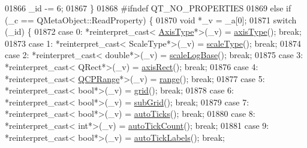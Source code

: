 \begin{DoxyCode}
01866         \_id -= 6;
01867     \}
01868 \textcolor{preprocessor}{#ifndef QT\_NO\_PROPERTIES}
01869       \textcolor{keywordflow}{else} \textcolor{keywordflow}{if} (\_c == QMetaObject::ReadProperty) \{
01870         \textcolor{keywordtype}{void} *\_v = \_a[0];
01871         \textcolor{keywordflow}{switch} (\_id) \{
01872         \textcolor{keywordflow}{case} 0: *\textcolor{keyword}{reinterpret\_cast<} \hyperlink{a00025_ae2bcc1728b382f10f064612b368bc18a}{AxisType}*\textcolor{keyword}{>}(\_v) = \hyperlink{a00025_a593c37bf6aa4990326dc09e24f45db7f}{axisType}(); \textcolor{keywordflow}{break};
01873         \textcolor{keywordflow}{case} 1: *\textcolor{keyword}{reinterpret\_cast<} ScaleType*\textcolor{keyword}{>}(\_v) = \hyperlink{a00025_a8563e13407bc0616da7f7c84e02de170}{scaleType}(); \textcolor{keywordflow}{break};
01874         \textcolor{keywordflow}{case} 2: *\textcolor{keyword}{reinterpret\_cast<} \textcolor{keywordtype}{double}*\textcolor{keyword}{>}(\_v) = \hyperlink{a00025_ac937d2a602f865aff2ab6c1e288739f6}{scaleLogBase}(); \textcolor{keywordflow}{break};
01875         \textcolor{keywordflow}{case} 3: *\textcolor{keyword}{reinterpret\_cast<} QRect*\textcolor{keyword}{>}(\_v) = \hyperlink{a00025_a7fe5b84f4891838b63ed5181f5811dc5}{axisRect}(); \textcolor{keywordflow}{break};
01876         \textcolor{keywordflow}{case} 4: *\textcolor{keyword}{reinterpret\_cast<} \hyperlink{a00049}{QCPRange}*\textcolor{keyword}{>}(\_v) = \hyperlink{a00025_ab1ea79a4f5ea4cf42620f8f51c477ac4}{range}(); \textcolor{keywordflow}{break};
01877         \textcolor{keywordflow}{case} 5: *\textcolor{keyword}{reinterpret\_cast<} \textcolor{keywordtype}{bool}*\textcolor{keyword}{>}(\_v) = \hyperlink{a00025_a5901fbdcd0e9f7e9cb2690b0bcef47ee}{grid}(); \textcolor{keywordflow}{break};
01878         \textcolor{keywordflow}{case} 6: *\textcolor{keyword}{reinterpret\_cast<} \textcolor{keywordtype}{bool}*\textcolor{keyword}{>}(\_v) = \hyperlink{a00025_a730554bcca1050436ee9e3c5cebfb447}{subGrid}(); \textcolor{keywordflow}{break};
01879         \textcolor{keywordflow}{case} 7: *\textcolor{keyword}{reinterpret\_cast<} \textcolor{keywordtype}{bool}*\textcolor{keyword}{>}(\_v) = \hyperlink{a00025_afc7f20e30dc2865ff6c39f3281f330c2}{autoTicks}(); \textcolor{keywordflow}{break};
01880         \textcolor{keywordflow}{case} 8: *\textcolor{keyword}{reinterpret\_cast<} \textcolor{keywordtype}{int}*\textcolor{keyword}{>}(\_v) = \hyperlink{a00025_ac87454a1342f5d2939ab59e68b4d515b}{autoTickCount}(); \textcolor{keywordflow}{break};
01881         \textcolor{keywordflow}{case} 9: *\textcolor{keyword}{reinterpret\_cast<} \textcolor{keywordtype}{bool}*\textcolor{keyword}{>}(\_v) = \hyperlink{a00025_a7169da316ac25dec1606784152fbf2c1}{autoTickLabels}(); \textcolor{keywordflow}{break};

\end{DoxyCode}
